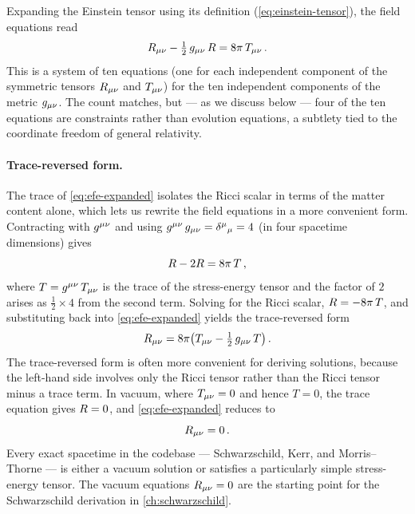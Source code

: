 Expanding the Einstein tensor using its definition
(\cref{eq:einstein-tensor}), the field equations read
%
\begin{equation}
  R_{\mu\nu} - \tfrac{1}{2}\,g_{\mu\nu}\,R = 8\pi\,T_{\mu\nu} \,.
  \label{eq:efe-expanded}
\end{equation}
%
This is a system of ten equations (one for each independent component of the
symmetric tensors $R_{\mu\nu}$ and $T_{\mu\nu}$) for the ten independent
components of the metric $g_{\mu\nu}$.  The count matches, but --- as we discuss
below --- four of the ten equations are constraints rather than evolution
equations, a subtlety tied to the coordinate freedom of general relativity.

\paragraph{Trace-reversed form.}

The trace of \cref{eq:efe-expanded} isolates the Ricci scalar in terms of
the matter content alone, which lets us rewrite the field equations in a more
convenient form.  Contracting with $g^{\mu\nu}$ and using
$g^{\mu\nu}\,g_{\mu\nu} = \delta^\mu{}_\mu = 4$ (in four spacetime
dimensions) gives
%
\begin{equation}
  R - 2R = 8\pi\,T \,,
  \label{eq:efe-trace}
\end{equation}
%
where $T = g^{\mu\nu}\,T_{\mu\nu}$ is the trace of the stress-energy
tensor and the factor of $2$ arises as $\tfrac{1}{2} \times 4$ from the
second term.  Solving for the Ricci scalar, $R = -8\pi\,T$, and
substituting back into \cref{eq:efe-expanded} yields the trace-reversed form
%
\begin{equation}
  R_{\mu\nu} = 8\pi\!\left(T_{\mu\nu}
    - \tfrac{1}{2}\,g_{\mu\nu}\,T\right) .
  \label{eq:efe-trace-reversed}
\end{equation}
%
The trace-reversed form is often more convenient for deriving solutions,
because the left-hand side involves only the Ricci tensor rather than the
Ricci tensor minus a trace term.  In vacuum, where $T_{\mu\nu} = 0$ and
hence $T = 0$, the trace equation gives $R = 0$, and
\cref{eq:efe-expanded} reduces to
%
\begin{equation}
  R_{\mu\nu} = 0 \,.
  \label{eq:vacuum-efe}
\end{equation}
%
Every exact spacetime in the codebase --- Schwarzschild, Kerr, and
Morris--Thorne --- is either a vacuum solution or satisfies a particularly
simple stress-energy tensor.  The vacuum equations $R_{\mu\nu} = 0$ are the
starting point for the Schwarzschild derivation in \cref{ch:schwarzschild}.

